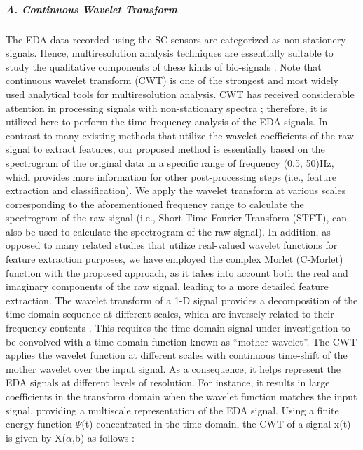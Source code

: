 \subparagraph{A. Continuous Wavelet Transform}
The EDA data recorded using the SC sensors are categorized as non-stationery signals\cite{AmbulatorySys2003, EmotionalState2013}. Hence, multiresolution analysis 
techniques are essentially suitable to study the qualitative components of these 
kinds of bio-signals \cite{AmbulatorySys2003}.  Note that continuous wavelet transform 
(CWT) is one of the strongest and most widely used analytical tools for multiresolution 
analysis. CWT has received considerable attention in processing signals with 
non-stationary spectra \cite{WaveletFilter1992, SignalDecomp1989}; therefore, it is 
utilized here to perform the time-frequency analysis of the EDA signals. In contrast 
to many existing methods that utilize the wavelet coefficients of the raw signal to 
extract features, our proposed method is essentially based on the spectrogram of the 
original data in a specific range of frequency (0.5, 50)Hz, which provides more 
information for other post-processing steps (i.e., feature extraction and classification).
We apply the wavelet transform at various scales corresponding to the 
aforementioned frequency range to calculate the spectrogram of the raw signal 
(i.e., Short Time Fourier Transform (STFT), can also be used to calculate the 
spectrogram of the raw signal). In addition, as opposed to many related studies 
that utilize real-valued wavelet functions for feature extraction purposes, we have 
employed the complex Morlet (C-Morlet) function with the proposed approach, as it 
takes into account both the real and imaginary components of the raw signal, leading 
to a more detailed feature extraction.
The wavelet transform of a 1-D signal provides a decomposition of the time-domain 
sequence at different scales, which are inversely related to their frequency contents\cite{SignalDecomp1989, ContinuWavelet2009} . This requires the time-domain signal under 
investigation to be convolved with a time-domain function known as “mother wavelet”. 
The CWT applies the wavelet function at different scales with continuous time-shift 
of the mother wavelet over the input signal. As a consequence, it helps represent 
the EDA signals at different levels of resolution. For instance, it results in large 
coefficients in the transform domain when the wavelet function matches the input 
signal, providing a multiscale representation of the EDA signal.
Using a finite energy function $\Psi$(t) concentrated in the time domain, the CWT of 
a signal x(t) is given by X($\alpha$,b) as follows \cite{WaveletFilter1992}:

